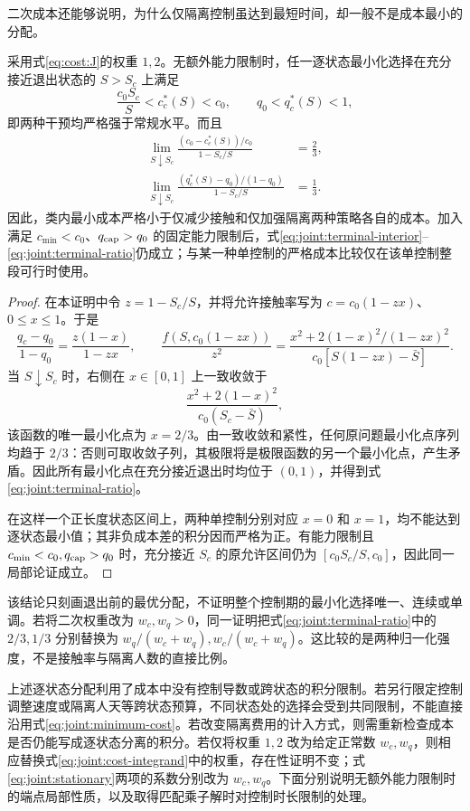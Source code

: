 \documentclass[lang=cn,a4paper,newtx]{elegantpaper}
\numberwithin{equation}{section}
\theoremstyle{plain}
\begin{document}
二次成本还能够说明，为什么仅隔离控制虽达到最短时间，却一般不是成本最小的分配。
\begin{proposition}
\label{prop:joint:terminal-allocation}
采用式\eqref{eq:cost:J}的权重 $1,2$。无额外能力限制时，任一逐状态最小化选择在充分接近退出状态的 $S>S_c$ 上满足
\begin{equation}
\frac{c_0S_c}{S}<c_c^*(S)<c_0,
\qquad q_0<q_c^*(S)<1,
\label{eq:joint:terminal-interior}
\end{equation}
即两种干预均严格强于常规水平。而且
\begin{equation}
\begin{aligned}
\lim_{S\downarrow S_c}
\frac{(c_0-c_c^*(S))/c_0}{1-S_c/S}&=\frac23,\\
\lim_{S\downarrow S_c}
\frac{(q_c^*(S)-q_0)/(1-q_0)}{1-S_c/S}&=\frac13.
\end{aligned}
\label{eq:joint:terminal-ratio}
\end{equation}
因此，类内最小成本严格小于仅减少接触和仅加强隔离两种策略各自的成本。加入满足 $c_{\min}<c_0$、$q_{\rm cap}>q_0$ 的固定能力限制后，式\eqref{eq:joint:terminal-interior}--\eqref{eq:joint:terminal-ratio}仍成立；与某一种单控制的严格成本比较仅在该单控制整段可行时使用。
\end{proposition}
\begin{proof}
在本证明中令 $z=1-S_c/S$，并将允许接触率写为
$c=c_0(1-zx)$、$0\le x\le1$。于是
\[
\frac{q_c-q_0}{1-q_0}=\frac{z(1-x)}{1-zx},\qquad
\frac{f(S,c_0(1-zx))}{z^2}
=\frac{x^2+2(1-x)^2/(1-zx)^2}
{c_0[S(1-zx)-\bar S]}.
\]
当 $S\downarrow S_c$ 时，右侧在 $x\in[0,1]$ 上一致收敛于
\[
\frac{x^2+2(1-x)^2}{c_0(S_c-\bar S)},
\]
该函数的唯一最小化点为 $x=2/3$。由一致收敛和紧性，任何原问题最小化点序列均趋于 $2/3$：否则可取收敛子列，其极限将是极限函数的另一个最小化点，产生矛盾。因此所有最小化点在充分接近退出时均位于 $(0,1)$，并得到式\eqref{eq:joint:terminal-ratio}。

在这样一个正长度状态区间上，两种单控制分别对应 $x=0$ 和 $x=1$，均不能达到逐状态最小值；其非负成本差的积分因而严格为正。有能力限制且 $c_{\min}<c_0,q_{\rm cap}>q_0$ 时，充分接近 $S_c$ 的原允许区间仍为 $[c_0S_c/S,c_0]$，因此同一局部论证成立。
\end{proof}
该结论只刻画退出前的最优分配，不证明整个控制期的最小化选择唯一、连续或单调。若将二次权重改为 $w_c,w_q>0$，同一证明把式\eqref{eq:joint:terminal-ratio}中的 $2/3,1/3$ 分别替换为 $w_q/(w_c+w_q),w_c/(w_c+w_q)$。这比较的是两种归一化强度，不是接触率与隔离人数的直接比例。

上述逐状态分配利用了成本中没有控制导数或跨状态的积分限制。若另行限定控制调整速度或隔离人天等跨状态预算，不同状态处的选择会受到共同限制，不能直接沿用式\eqref{eq:joint:minimum-cost}。若改变隔离费用的计入方式，则需重新检查成本是否仍能写成逐状态分离的积分。若仅将权重 $1,2$ 改为给定正常数 $w_c,w_q$，则相应替换式\eqref{eq:joint:cost-integrand}中的权重，存在性证明不变；式\eqref{eq:joint:stationary}两项的系数分别改为 $w_c,w_q$。下面分别说明无额外能力限制时的端点局部性质，以及取得匹配乘子解时对控制时长限制的处理。
\end{document}
